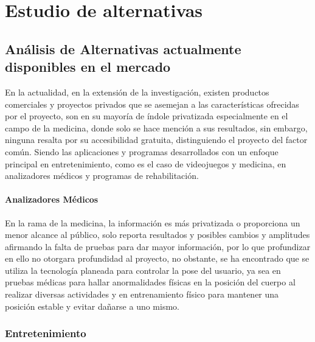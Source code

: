 \chapter{Estudio de alternativas}

\section{Análisis de Alternativas actualmente disponibles en el mercado}

En la actualidad, en la extensión de la investigación, existen productos comerciales y proyectos privados que se asemejan a las características ofrecidas por el proyecto, son en su mayoría de índole privatizada especialmente en el campo de la medicina, donde solo se hace mención a sus resultados, sin embargo, ninguna resalta por su accesibilidad gratuita, distinguiendo el proyecto del factor común. Siendo las aplicaciones y programas desarrollados con un enfoque principal en entretenimiento, como es el caso de videojuegos y medicina, en analizadores médicos y programas de rehabilitación.\\

\subsubsection{Analizadores Médicos}

En la rama de la medicina, la información es más privatizada o proporciona un menor alcance al público, solo reporta resultados y posibles cambios y amplitudes afirmando la falta de pruebas para dar mayor información, por lo que profundizar en ello no otorgara profundidad al proyecto, no obstante, se ha encontrado que se utiliza la tecnología planeada para controlar la pose del usuario, ya sea en pruebas médicas para hallar anormalidades físicas en la posición del cuerpo al realizar diversas actividades y en entrenamiento físico para mantener una posición estable y evitar dañarse a uno mismo.

\subsection{Entretenimiento}


